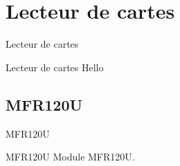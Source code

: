 \section{Lecteur de cartes}
\begin{frame}{Lecteur de cartes}
	\begin{block}{Lecteur de cartes}
        Hello
	\end{block}
\end{frame}


\subsection{MFR120U}
\begin{frame}{MFR120U}
	\begin{block}{MFR120U}
        Module MFR120U.
	\end{block}
\end{frame}
